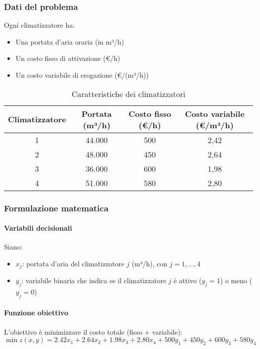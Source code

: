 \subsubsection{Dati del problema}
Ogni climatizzatore ha:
\begin{itemize}
    \item Una portata d'aria oraria (in m³/h)
    \item Un costo fisso di attivazione (€/h)
    \item Un costo variabile di erogazione (€/(m³/h))
\end{itemize}

\begin{table}[htbp]
    \centering
    \caption{Caratteristiche dei climatizzatori}
    \begin{tabular}{|c|c|c|c|}
        \hline
        \textbf{Climatizzatore} & \textbf{Portata (m³/h)} & \textbf{Costo fisso (€/h)} & \textbf{Costo variabile (€/m³/h)} \\
        \hline
        1 & 44.000 & 500 & 2,42 \\
        2 & 48.000 & 450 & 2,64 \\
        3 & 36.000 & 600 & 1,98 \\
        4 & 51.000 & 580 & 2,80 \\
        \hline
    \end{tabular}
\end{table}

\subsubsection{Formulazione matematica}
\paragraph{Variabili decisionali}
Siano:
\begin{itemize}
    \item $x_j$: portata d'aria del climatizzatore $j$ (m³/h), con $j = 1, \ldots, 4$
    \item $y_j$: variabile binaria che indica se il climatizzatore $j$ è attivo ($y_j = 1$) o meno ($y_j = 0$)
\end{itemize}

\paragraph{Funzione obiettivo}
L'obiettivo è minimizzare il costo totale (fisso + variabile):
\[
\min z(x, y) = 2.42x_1 + 2.64x_2 + 1.98x_3 + 2.80x_4 + 500y_1 + 450y_2 + 600y_3 + 580y_4
\]

